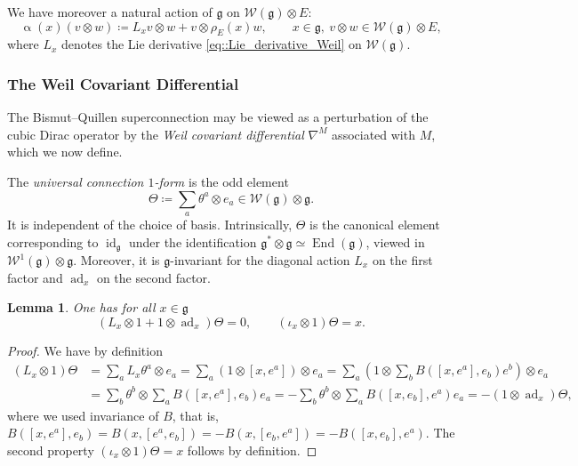 \documentclass[11pt]{amsart}
\newcommand{\id}{\operatorname{id}}
\newcommand{\End}{\operatorname{End}}
\newcommand{\ad}{\operatorname{ad}}
\def\Weil{{\mathcal{W}(\gg)}}
\def\gg{{\mathfrak{g}}}
\theoremstyle{plain}
\newtheorem{lemma}[theorem]{Lemma}
\theoremstyle{remark}
\theoremstyle{definition}
\numberwithin{equation}{section}
\theoremstyle{remark}
\begin{document}
We have moreover a natural action of $\gg$ on $\mathcal{W}(\gg)\otimes E$:
\begin{equation}
 \upalpha(x)(v\otimes w)\coloneqq L_{x}v \otimes w + v\otimes \rho_{E}(x)w, \qquad x \in \gg, \ v\otimes w \in \mathcal{W}(\gg)\otimes E,
\end{equation}
where $L_{x}$ denotes the Lie derivative \eqref{eq::Lie_derivative_Weil} on $\Weil$.

\subsubsection{The Weil Covariant Differential} The Bismut--Quillen superconnection may be viewed as a perturbation of the cubic Dirac operator by the \emph{Weil covariant differential} $\nabla^{M}$ associated with $M$, which we now define. 

The \emph{universal connection $1$-form} is the odd element
\begin{equation}
\Theta\coloneqq \sum_{a}\theta^{a}\otimes e_{a}\in \mathcal{W}(\gg)\otimes\gg.
\end{equation}
It is independent of the choice of basis. Intrinsically, $\Theta$ is the canonical element
corresponding to $\id_{\mathfrak g}$ under the identification
$\mathfrak g^{*}\otimes\mathfrak g\simeq \End(\mathfrak g)$, viewed in
$\mathcal W^{1}(\mathfrak g)\otimes\mathfrak g$. Moreover, it is $\gg$-invariant for the diagonal action $L_{x}$ on the first factor and $\ad_{x}$ on the second factor. 

\begin{lemma} \label{lemm::invariance_theta}
 One has for all $x \in \gg$
 \[
 (L_{x}\otimes 1+1\otimes \ad_{x})\Theta=0, \qquad (\iota_{x}\otimes 1)\Theta=x. 
 \]
\end{lemma}

\begin{proof}
 We have by definition
 \[
 \begin{aligned}
 (L_{x}\otimes 1)\Theta &=\sum_{a}L_{x}\theta^{a}\otimes e_{a}=\sum_{a} (1\otimes [x,e^{a}]) \otimes e_{a}=\sum_{a}(1 \otimes \sum_{b} B([x,e^{a}],e_{b})e^{b}) \otimes e_{a} \\ &=
 \sum_{b} \theta^{b}\otimes \sum_{a}B([x,e^{a}],e_{b})e_{a}=-\sum_{b}\theta^{b}\otimes \sum_{a}B([x,e_{b}],e^{a})e_{a}= -(1\otimes \ad_{x})\Theta,
 \end{aligned} 
 \]
 where we used invariance of $B$, that is, $B([x,e^{a}],e_{b})=B(x,[e^{a},e_{b}])=-B(x,[e_{b},e^{a}])=-B([x,e_{b}],e^{a})$. The second property $(\iota_{x}\otimes 1)\Theta=x$ follows by definition.
\end{proof}
\end{document}
